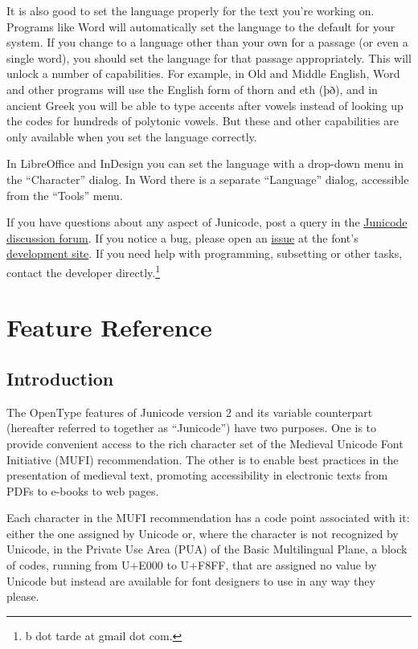 \documentclass[12pt,letterpaper,openany]{book}
\newcounter{Feature}
\begin{document}
It is also good to set the language properly for the text you're working on.
Programs like Word will automatically set the language to the default for your system. If you
change to a language other than your own for a passage (or even a single word),
you should set the language for that passage appropriately. This will unlock
a number of capabilities. For example, in Old and Middle English, Word and
other programs will use the English form of thorn and eth (þð), and in ancient
Greek you will be able to type accents after vowels instead of looking up
the codes for hundreds of polytonic vowels. But these and other capabilities
are only available when you set the language correctly.

In LibreOffice and InDesign you can set the language with a drop-down menu
in the “Character” dialog. In Word there is a separate “Language” dialog,
accessible from the “Tools” menu.

If you have questions about any aspect of Junicode,
post a query in the \href{https://github.com/psb1558/Junicode-font/discussions}%
{Junicode discussion forum}. If you notice a bug, please open an
\href{https://github.com/psb1558/Junicode-font/issues}{issue} at the font's
\href{https://github.com/psb1558/Junicode-font}{development site}. If you need
help with programming, subsetting or other tasks, contact the developer
directly.\footnote{b dot tarde at gmail dot com.}

\chapter*{\color{RViolet}Feature Reference}\hypertarget{FeatureReference}{}

\hypertarget{intro}{}\section{Introduction}
The OpenType features of Junicode version 2 and its variable counterpart (hereafter referred to together as
``Junicode'') have two purposes. One is to provide convenient access to the rich character set of the Medieval Unicode
Font Initiative (MUFI) recommendation. The other is to enable best practices in the presentation of medieval text,
promoting accessibility in electronic texts from PDFs to e-books to web pages.

Each character in the MUFI recommendation has a code point associated with it: either the one
assigned by Unicode or, where the character is not recognized by Unicode, in the Private Use Area (PUA) of the Basic
Multilingual Plane, a block of codes, running from U+E000 to U+F8FF, that are assigned no value by Unicode but instead
are available for font designers to use in any way they please.
\end{document}
